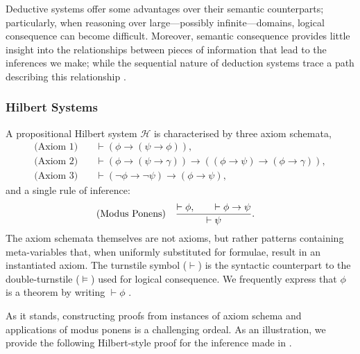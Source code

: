 Deductive systems offer some advantages over their semantic counterparts; particularly, when reasoning over large---possibly infinite---domains, logical consequence can become difficult. Moreover, semantic consequence provides little insight into the relationships between pieces of information that lead to the inferences we make; while the sequential nature of deduction systems trace a path describing this relationship \cite[p. 55]{Ben1993Mathematical}.

\subsubsection{Hilbert Systems} 
\label{subsubsection:hilbert-systems}

A propositional Hilbert system $\mathcal{H}$ is characterised by three axiom schemata, 
\begin{align}
    \text{(Axiom 1)} \quad & \vdash (\phi \rightarrow (\psi \rightarrow \phi)),  \\ 
    \text{(Axiom 2)} \quad & \vdash (\phi \rightarrow (\psi \rightarrow \gamma)) \rightarrow ((\phi \rightarrow \psi) \rightarrow (\phi \rightarrow \gamma)), \\
    \text{(Axiom 3)} \quad & \vdash (\neg \phi \rightarrow \neg \psi) \rightarrow (\phi \rightarrow \psi),
\end{align}
%
and a single rule of inference:
%
\begin{align}
     \index{Rule of inference! \textit{modus ponens}}
     \text{(Modus Ponens)} \quad & \frac{\vdash \phi, \qquad \vdash \phi \rightarrow \psi}{\vdash \psi}.
\end{align}
%
The axiom schemata themselves are not axioms, but rather patterns containing meta-variables that, when uniformly substituted for formulae, result in an instantiated axiom. The turnstile symbol ($\vdash$) is the syntactic counterpart to the double-turnstile ($\vDash$) used for logical consequence. We frequently express that $\phi$ is a theorem by writing $\vdash \phi$ \cite[p. 55]{Ben1993Mathematical}. 

As it stands, constructing proofs from instances of axiom schema and applications of modus ponens is a challenging ordeal. As an illustration, we provide the following Hilbert-style proof for the inference made in . 

